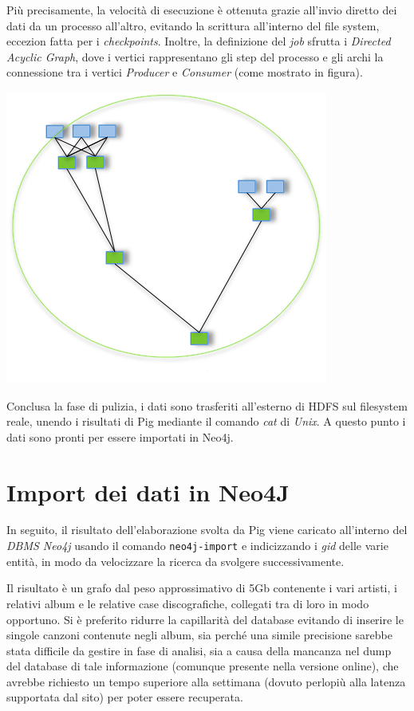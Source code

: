 \documentclass[12pt, a4paper, twocolumn]{article} %
\begin{document}
Più precisamente, la velocità di esecuzione è ottenuta grazie all'invio diretto dei dati da un processo all'altro, evitando la scrittura all'interno del file system, eccezion fatta per i \textit{checkpoints}.
Inoltre, la definizione del \textit{job} sfrutta i \textit{Directed Acyclic Graph}, dove i vertici rappresentano gli step del processo e gli archi la connessione tra i vertici \textit{Producer} e \textit{Consumer} (come mostrato in figura\cite{apacheTez, tez}).

\includegraphics[width=0.9\linewidth]{tez.png}

Conclusa la fase di pulizia, i dati sono trasferiti all'esterno di HDFS sul filesystem reale, unendo i risultati di Pig  mediante il comando \textit{cat} di \textit{Unix}. 
A questo punto i dati sono pronti per essere importati in Neo4j.


\section{Import dei dati in Neo4J}
In seguito, il risultato dell'elaborazione svolta da Pig viene caricato all'interno del \textit{DBMS Neo4j} usando il comando \verb|neo4j-import|\cite{neo4jImport} e indicizzando i \textit{gid} delle varie entità, in modo da velocizzare la ricerca da svolgere successivamente.

Il risultato è un grafo dal peso approssimativo di 5Gb contenente i vari artisti, i relativi album e le relative case discografiche, collegati tra di loro in modo opportuno.
Si è preferito ridurre la capillarità del database evitando di inserire le singole canzoni contenute negli album, sia perché una simile precisione sarebbe stata difficile da gestire in fase di analisi, sia a causa della mancanza nel dump del database di tale informazione (comunque presente nella versione online), che avrebbe richiesto un tempo superiore alla settimana (dovuto perlopiù alla latenza supportata dal sito) per poter essere recuperata.
\end{document}
